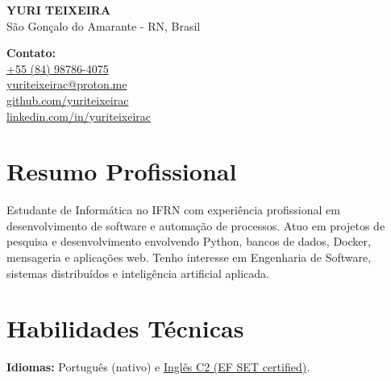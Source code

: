\documentclass[a4paper,10pt]{article}
\begin{document}

\noindent
\begin{minipage}[t]{0.5\textwidth}
    {\LARGE \textbf{YURI TEIXEIRA}} \\ [0.4em]
     \space São Gonçalo do Amarante - RN, Brasil \\
\end{minipage}%
\begin{minipage}[t]{0.5\textwidth}
    \raggedleft
     \textbf{Contato:} \\ [0.3em]
     \space \href{https://wa.me/5584987864075}{+55 (84) 98786-4075} \\ [0.3em]
     \space \href{mailto:yuriteixeirac@proton.me}{yuriteixeirac@proton.me} \\ [0.3em]
     \space \href{https://github.com/yuriteixeirac}{github.com/yuriteixeirac} \\ [0.3em]
     \space \href{https://linkedin.com/in/yuriteixeirac}{linkedin.com/in/yuriteixeirac} \\ [0.3em]
\end{minipage}

\vspace{1pt}

\section*{Resumo Profissional}

\vspace{1pt}

\noindent
Estudante de Informática no IFRN com experiência profissional em desenvolvimento de software e automação de processos. Atuo em projetos de pesquisa e desenvolvimento envolvendo Python, bancos de dados, Docker, mensageria e aplicações web. Tenho interesse em Engenharia de Software, sistemas distribuídos e inteligência artificial aplicada.

\section*{Habilidades Técnicas}

\noindent\textbf{Idiomas:}
Português (nativo) e \href{https://cert.efset.org/ixxqRg}{Inglês C2 (EF SET certified)}.
\end{document}

